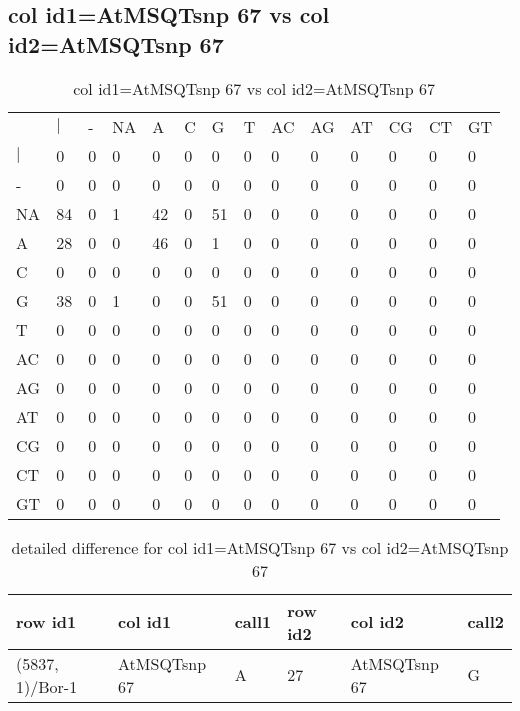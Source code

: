 \subsection{col id1=AtMSQTsnp 67 vs col id2=AtMSQTsnp 67}
\begin{center}
\begin{longtable}{|l|l|l|l|l|l|l|l|l|l|l|l|l|l|}
\caption{col id1=AtMSQTsnp 67 vs col id2=AtMSQTsnp 67} \label{table_dm960}\\
\hline
\\
\hline
&$|$&-&NA&A&C&G&T&AC&AG&AT&CG&CT&GT\\
$|$&0&0&0&0&0&0&0&0&0&0&0&0&0\\
-&0&0&0&0&0&0&0&0&0&0&0&0&0\\
NA&84&0&1&42&0&51&0&0&0&0&0&0&0\\
A&28&0&0&46&0&1&0&0&0&0&0&0&0\\
C&0&0&0&0&0&0&0&0&0&0&0&0&0\\
G&38&0&1&0&0&51&0&0&0&0&0&0&0\\
T&0&0&0&0&0&0&0&0&0&0&0&0&0\\
AC&0&0&0&0&0&0&0&0&0&0&0&0&0\\
AG&0&0&0&0&0&0&0&0&0&0&0&0&0\\
AT&0&0&0&0&0&0&0&0&0&0&0&0&0\\
CG&0&0&0&0&0&0&0&0&0&0&0&0&0\\
CT&0&0&0&0&0&0&0&0&0&0&0&0&0\\
GT&0&0&0&0&0&0&0&0&0&0&0&0&0\\
\hline
\end{longtable}
\end{center}

\begin{center}
\begin{longtable}{|l|l|l|l|l|l|}
\caption{detailed difference for col id1=AtMSQTsnp 67 vs col id2=AtMSQTsnp 67} \label{table_dm961}\\
\hline
row id1&col id1&call1&row id2&col id2&call2\\
\hline
(5837, 1)/Bor-1&AtMSQTsnp 67&A&27&AtMSQTsnp 67&G\\
\hline
\end{longtable}
\end{center}

